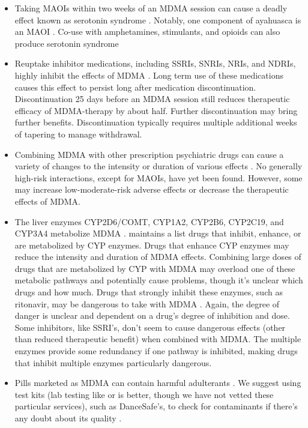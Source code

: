 \documentclass[12pt,letterpaper]{book}
\begin{document}
\begin{itemize}
    \item Taking MAOIs within two weeks of an MDMA session can cause a deadly effect known as serotonin syndrome \cite{malcolmSerotonin,edinoffInteractions}. Notably, one component of ayahuasca is an MAOI \cite{ruffell2020pharmacological}. Co-use with amphetamines, stimulants, and opioids can also produce serotonin syndrome \cite{makunts2022reported}
    \item Reuptake inhibitor medications, including SSRIs, SNRIs, NRIs, and NDRIs, highly inhibit the effects of MDMA \cite{feducciaSSRIDiscontinuation}. Long term use of these medications causes this effect to persist long after medication discontinuation. Discontinuation 25 days before an MDMA session still reduces therapeutic efficacy of MDMA-therapy by about half. Further discontinuation may bring further benefits. Discontinuation typically requires multiple additional weeks of tapering to manage withdrawal.
    \item Combining MDMA with other prescription psychiatric drugs can cause a variety of changes to the intensity or duration of various effects \cite{sarparastDrugInteractions}. No generally high-risk interactions, except for MAOIs, have yet been found. However, some may increase low-moderate-risk adverse effects or decrease the therapeutic effects of MDMA.
    \item The liver enzymes CYP2D6/COMT, CYP1A2, CYP2B6, CYP2C19, and CYP3A4 metabolize MDMA \cite{torreEnzymes,sarparastDrugInteractions}. \textcite{flockartTable} maintains a list drugs that inhibit, enhance, or are metabolized by CYP enzymes. Drugs that enhance CYP enzymes may reduce the intensity and duration of MDMA effects. Combining large doses of drugs that are metabolized by CYP with MDMA may overload one of these metabolic pathways and potentially cause problems, though it's unclear which drugs and how much. Drugs that strongly inhibit these enzymes, such as ritonavir, may be dangerous to take with MDMA \cite{sarparastDrugInteractions}. Again, the degree of danger is unclear and dependent on a drug's degree of inhibition and dose. Some inhibitors, like SSRI's, don't seem to cause dangerous effects (other than reduced therapeutic benefit) when combined with MDMA. The multiple enzymes provide some redundancy if one pathway is inhibited, making drugs that inhibit multiple enzymes particularly dangerous.
    \item Pills marketed as MDMA can contain harmful adulterants \cite{saleemiAdulterants}. We suggest using test kits (lab testing like \textcite{kykeonTesting} or \textcite{energyTesting} is better, though we have not vetted these particular services), such as DanceSafe's, to check for contaminants if there's any doubt about its quality \cite{danceSafeTestingKit}.
\end{itemize}
\end{document}
